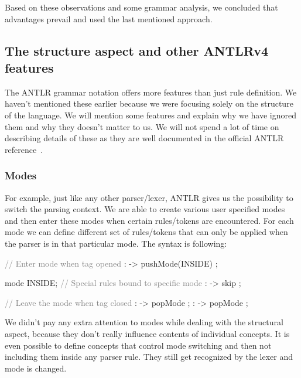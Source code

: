 Based on these observations and some grammar analysis, we concluded that advantages prevail and used the last mentioned approach.

\subsection{The structure aspect and other ANTLRv4 features}

The ANTLR grammar notation offers more features than just rule definition.
We haven't mentioned these earlier because we were focusing solely on the structure of the language.
We will mention some features and explain why we have ignored them and why they doesn't matter to us.
We will not spend a lot of time on describing details of these as they are well documented in the official ANTLR reference~\cite{ANTLR4reference}.

\subsubsection{Modes}

For example, just like any other parser/lexer, ANTLR gives us the possibility to switch the parsing context.
We are able to create various user specified modes and then enter these modes when certain rules/tokens are encountered.
For each mode we can define different set of rules/tokens that can only be applied when the parser is in that particular mode.
The syntax is following:

\begin{antlr}
	\textcolor{gray}{// Enter mode when tag opened}
	        :   \literal{<}       -> pushMode(INSIDE) ;

	mode INSIDE;
	\textcolor{gray}{// Special rules bound to specific mode}
	           :    -> skip ;

	\textcolor{gray}{// Leave the mode when tag closed}
	       :   \literal{>}       -> popMode ;
	 :   \literal{/>}      -> popMode ;
\end{antlr}

We didn't pay any extra attention to modes while dealing with the structural aspect, because they don't really influence contents of individual concepts.
It is even possible to define concepts that control mode switching and then not including them inside any parser rule.
They still get recognized by the lexer and mode is changed.
\\

